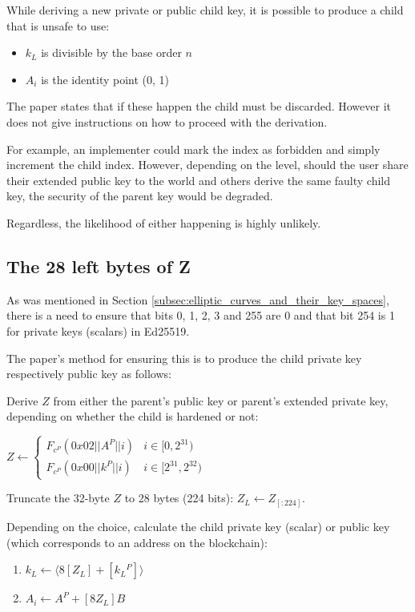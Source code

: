 \documentclass[12pt, a4paper, twocolumn]{article}
\begin{document}
While deriving a new private or public child key, it is possible to produce a child that is unsafe to use:

\begin{itemize}[label=\textendash, itemsep=-0.5em]
  \item $k_L$ is divisible by the base order $n$
  \item $A_i$ is the identity point (0, 1)
\end{itemize}

The paper states that if these happen the child must be discarded. However it does not give instructions on how to proceed with the derivation.

For example, an implementer could mark the index as forbidden and simply increment the child index. However, depending on the level, should the user share their extended public key to the world and others derive the same faulty child key, the security of the parent key would be degraded.

Regardless, the likelihood of either happening is highly unlikely.

\subsection{The 28 left bytes of Z}
\label{subsec:the_28_left_bytes_of_z}

As was mentioned in Section \ref{subsec:elliptic_curves_and_their_key_spaces}, there is a need to ensure that bits 0, 1, 2, 3 and 255 are 0 and that bit 254 is 1 for private keys (scalars) in Ed25519.

The paper's method for ensuring this is to produce the child private key respectively public key as follows:

Derive $Z$ from either the parent's public key or parent's extended private key, depending on whether the child is hardened or not:

$  Z \leftarrow 
  \begin{cases} 
  F_{c^P}(0x02||A^P||i) & i \in  [0, 2^{31}) \\
  F_{c^P}(0x00||k^P||i) & i \in [2^{31}, 2^{32})
  \end{cases}
  $

Truncate the 32-byte $Z$ to 28 bytes (224 bits): $Z_L \leftarrow Z_{[:224]}$.

Depending on the choice, calculate the child private key (scalar) or public key (which corresponds to an address on the blockchain):

\begin{enumerate}[label={}] 
  \item $k_L \leftarrow \langle 8[Z_L]  + [k{_L}^P]\rangle$ 
  \item $A_i \leftarrow A^P + [8Z_L]B$
\end{enumerate}
\end{document}
